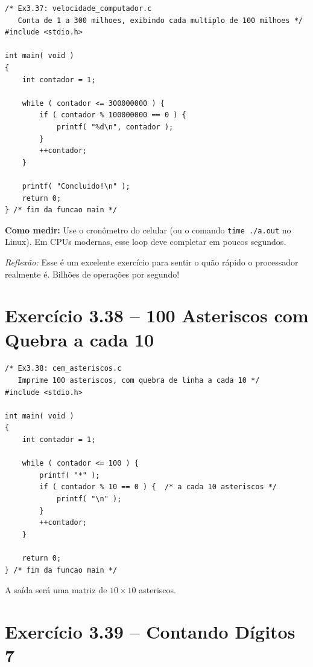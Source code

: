 \documentclass[12pt,a4paper]{article}
\begin{document}
\begin{respostabox}
\begin{lstlisting}
/* Ex3.37: velocidade_computador.c
   Conta de 1 a 300 milhoes, exibindo cada multiplo de 100 milhoes */
#include <stdio.h>

int main( void )
{
    int contador = 1;

    while ( contador <= 300000000 ) {
        if ( contador % 100000000 == 0 ) {
            printf( "%d\n", contador );
        }
        ++contador;
    }

    printf( "Concluido!\n" );
    return 0;
} /* fim da funcao main */
\end{lstlisting}

\textbf{Como medir:} Use o cronômetro do celular (ou o comando \texttt{time ./a.out}
no Linux). Em CPUs modernas, esse loop deve completar em poucos segundos.

\textit{Reflexão:} Esse é um excelente exercício para sentir o quão rápido o
processador realmente é. Bilhões de operações por segundo!
\end{respostabox}

\section{Exercício 3.38 -- 100 Asteriscos com Quebra a cada 10}

\begin{respostabox}
\begin{lstlisting}
/* Ex3.38: cem_asteriscos.c
   Imprime 100 asteriscos, com quebra de linha a cada 10 */
#include <stdio.h>

int main( void )
{
    int contador = 1;

    while ( contador <= 100 ) {
        printf( "*" );
        if ( contador % 10 == 0 ) {  /* a cada 10 asteriscos */
            printf( "\n" );
        }
        ++contador;
    }

    return 0;
} /* fim da funcao main */
\end{lstlisting}

A saída será uma matriz de $10 \times 10$ asteriscos.
\end{respostabox}

\section{Exercício 3.39 -- Contando Dígitos 7}
\end{document}

